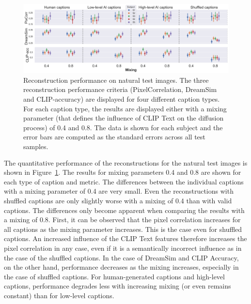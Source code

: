 \begin{figure}[ht]
    \centering
    \includegraphics[width=1\textwidth]{plots/aicap_reconstruction_test_both_mixings.png}
    \caption[Experiment 2: Reconstruction performance on natural test images]{Reconstruction performance on natural test images. The three reconstruction performance criteria (PixelCorrelation, DreamSim and CLIP-accuracy) are displayed for four different caption types. For each caption type, the results are displayed either with a mixing parameter (that defines the influence of CLIP Text on the diffusion process) of 0.4 and 0.8. The data is shown for each subject and the error bars are computed as the standard errors across all test samples.}\label{fig:aicap_reconstruction_test_both_mixings}
\end{figure}
The quantitative performance of the reconstructions for the natural test images is shown in Figure~\ref{fig:aicap_reconstruction_test_both_mixings}. The results for mixing parameters 0.4 and 0.8 are shown for each type of caption and metric. The differences between the individual captions with a mixing parameter of 0.4 are very small. Even the reconstructions with shuffled captions are only slightly worse with a mixing of 0.4 than with valid captions. The differences only become apparent when comparing the results with a mixing of 0.8. First, it can be observed that the pixel correlation increases for all captions as the mixing parameter increases. This is the case even for shuffled captions. An increased influence of the CLIP Text features therefore increases the pixel correlation in any case, even if it is a semantically incorrect influence as in the case of the shuffled captions. In the case of DreamSim and CLIP Accuracy, on the other hand, performance decreases as the mixing increases, especially in the case of shuffled captions. For human-generated captions and high-level captions, performance degrades less with increasing mixing (or even remains constant) than for low-level captions. 

